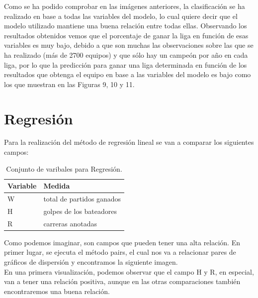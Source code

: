 \documentclass[10pt]{article}
\begin{document}
Como se ha podido comprobar en las imágenes anteriores, la clasificación se ha realizado en base a todas las variables del modelo, lo cual quiere decir que el modelo utilizado mantiene una buena relación entre todas ellas. Observando los resultados obtenidos vemos que el porcentaje de ganar la liga en función de esas variables es muy bajo, debido a que son muchas las observaciones sobre las que se ha realizado (más de 2700 equipos) y que sólo hay un campeón por año en cada liga, por lo que la predicción para ganar una liga determinada en función de los resultados que obtenga el equipo en base a las variables del modelo es bajo como los que muestran en las Figuras 9, 10 y 11.\\


\section{Regresión}

Para la realización del método de regresión lineal se van a comparar los siguientes campos:\\

\begin{table}[htbp]
\begin{center}
\begin{tabular}{|l|l|}
\hline
Variable & Medida \\
\hline \hline
W & total de partidos ganados \\ \hline
H & golpes de los bateadores \\ \hline
R & carreras anotadas \\ \hline
\end{tabular}
\caption{Conjunto de varibales para Regresión.}
\label{Tabla:}
\end{center}
\end{table}

Como podemos imaginar, son campos que pueden tener una alta relación. En primer lugar, se ejecuta el método pairs, el cual nos va a relacionar pares de gráficos de dispersión y encontramos la siguiente imagen.\\

En una primera visualización, podemos observar que el campo H y R, en especial, van a tener una relación positiva, aunque en las otras comparaciones también encontraremos una buena relación.\\
\end{document}
